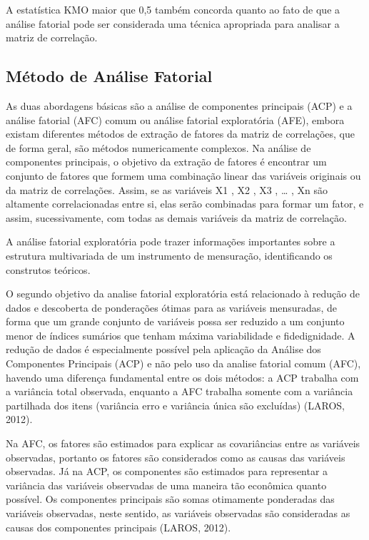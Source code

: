 \documentclass[12pt,brazil,]{book}
\begin{document}
A estatística KMO maior que 0,5 também concorda quanto ao fato de que a
análise fatorial pode ser considerada uma técnica apropriada para
analisar a matriz de correlação.

\hypertarget{metodo-de-analise-fatorial}{%
\subsection{Método de Análise
Fatorial}\label{metodo-de-analise-fatorial}}

As duas abordagens básicas são a análise de componentes principais (ACP)
e a análise fatorial (AFC) comum ou análise fatorial exploratória (AFE),
embora existam diferentes métodos de extração de fatores da matriz de
correlações, que de forma geral, são métodos numericamente complexos. Na
análise de componentes principais, o objetivo da extração de fatores é
encontrar um conjunto de fatores que formem uma combinação linear das
variáveis originais ou da matriz de correlações. Assim, se as variáveis
X1 , X2 , X3 , \ldots{} , Xn são altamente correlacionadas entre si,
elas serão combinadas para formar um fator, e assim, sucessivamente, com
todas as demais variáveis da matriz de correlação.

A análise fatorial exploratória pode trazer informações importantes
sobre a estrutura multivariada de um instrumento de mensuração,
identificando os construtos teóricos.

O segundo objetivo da analise fatorial exploratória está relacionado à
redução de dados e descoberta de ponderações ótimas para as variáveis
mensuradas, de forma que um grande conjunto de variáveis possa ser
reduzido a um conjunto menor de índices sumários que tenham máxima
variabilidade e fidedignidade. A redução de dados é especialmente
possível pela aplicação da Análise dos Componentes Principais (ACP) e
não pelo uso da analise fatorial comum (AFC), havendo uma diferença
fundamental entre os dois métodos: a ACP trabalha com a variância total
observada, enquanto a AFC trabalha somente com a variância partilhada
dos itens (variância erro e variância única são excluídas) (LAROS,
2012).

Na AFC, os fatores são estimados para explicar as covariâncias entre as
variáveis observadas, portanto os fatores são considerados como as
causas das variáveis observadas. Já na ACP, os componentes são estimados
para representar a variância das variáveis observadas de uma maneira tão
econômica quanto possível. Os componentes principais são somas
otimamente ponderadas das variáveis observadas, neste sentido, as
variáveis observadas são consideradas as causas dos componentes
principais (LAROS, 2012).
\end{document}

